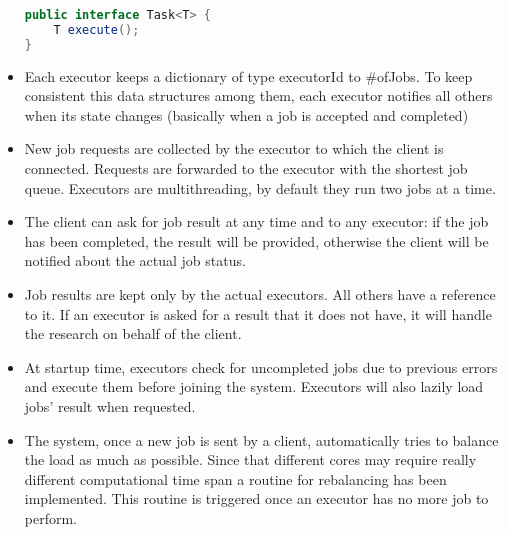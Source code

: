 \documentclass{article}
\begin{document}
\begin{itemize}
\begin{file}
\begin{lstlisting}[language=Java]
public interface Task<T> {
    T execute();
}
\end{lstlisting}
\end{file}
	\item Each executor keeps a dictionary of type executorId to \#ofJobs. To keep consistent this data structures among them, each executor notifies all others when its state changes (basically when a job is accepted and completed)
	\item New job requests are collected by the executor to which the client is connected. Requests are forwarded to the executor with the shortest job queue. Executors are multithreading, by default they run two jobs at a time.
	\item The client can ask for job result at any time and to any executor: if the job has been completed, the result will be provided, otherwise the client will be notified about the actual job status.
	\item Job results are kept only by the actual executors. All others have a reference to it. If an executor is asked for a result that it does not have, it will handle the research on behalf of the client.
	\item At startup time, executors check for uncompleted jobs due to previous errors and execute them before joining the system. Executors will also lazily load jobs' result when requested.
	\item The system, once a new job is sent by a client, automatically tries to balance the load as much as possible. Since that different cores may require really different computational time span a routine for rebalancing has been implemented. This routine is triggered once an executor has no more job to perform.
		
\end{itemize}
\end{document}
